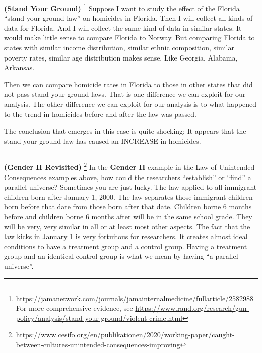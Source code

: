 \documentclass[
]{book}
\begin{document}
\textbf{(Stand Your Ground)} \footnote{\url{https://jamanetwork.com/journals/jamainternalmedicine/fullarticle/2582988}
  For more comprehensive evidence, see
  \url{https://www.rand.org/research/gun-policy/analysis/stand-your-ground/violent-crime.html}} Suppose I want to study the effect of the Florida ``stand your ground law'' on homicides in Florida. Then I will collect all kinds of data for Florida. And I will collect the same kind of data in similar states. It would make little sense to compare Florida to Norway. But comparing Florida to states with similar income distribution, similar ethnic composition, similar poverty rates, similar age distribution makes sense. Like Georgia, Alabama, Arkansas.

Then we can compare homicide rates in Florida to those in other states that did not pass stand your ground laws. That is one difference we can exploit for our analysis. The other difference we can exploit for our analysis is to what happened to the trend in homicides before and after the law was passed.

The conclusion that emerges in this case is quite shocking: It appears that the stand your ground law has caused an INCREASE in homicides.

\begin{center}\rule{0.5\linewidth}{0.5pt}\end{center}

\textbf{(Gender II Revisited)} \footnote{\url{https://www.cesifo.org/en/publikationen/2020/working-paper/caught-between-cultures-unintended-consequences-improving}} In the \textbf{Gender II} example in the Law of Unintended Consequences examples above, how could the researchers ``establish'' or ``find'' a parallel universe? Sometimes you are just lucky. The law applied to all immigrant children born after January 1, 2000. The law separates those immigrant children born before that date from those born after that date. Children borne 6 months before and children borne 6 months after will be in the same school grade. They will be very, very similar in all or at least most other aspects. The fact that the law kicks in January 1 is very fortuitous for researchers. It creates almost ideal conditions to have a treatment group and a control group. Having a treatment group and an identical control group is what we mean by having ``a parallel universe''.

\begin{center}\rule{0.5\linewidth}{0.5pt}\end{center}
\end{document}
